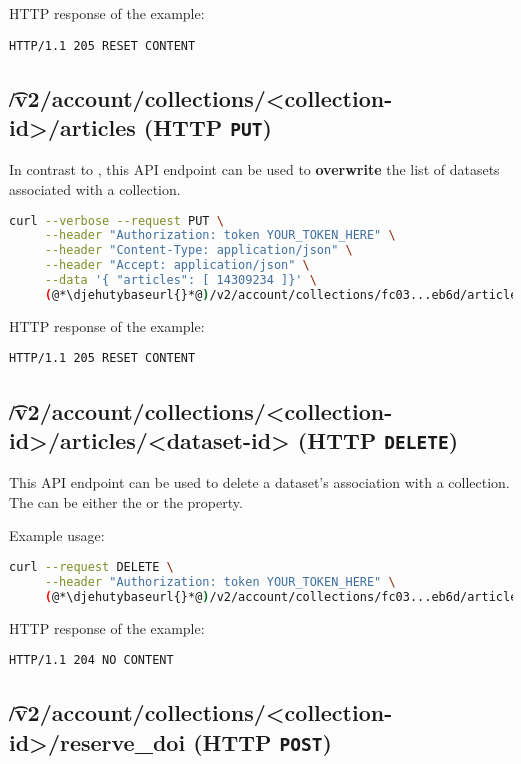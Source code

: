   HTTP response of the example:
\begin{lstlisting}
HTTP/1.1 205 RESET CONTENT
\end{lstlisting}

\subsection{\t{/v2/account/collections/<collection-id>/articles} (HTTP \texttt{PUT})}

  In contrast to , this API endpoint
  can be used to \textbf{overwrite} the list of datasets associated with a
  collection.

\begin{lstlisting}[language=bash]
curl --verbose --request PUT \
     --header "Authorization: token YOUR_TOKEN_HERE" \
     --header "Content-Type: application/json" \
     --header "Accept: application/json" \
     --data '{ "articles": [ 14309234 ]}' \
     (@*\djehutybaseurl{}*@)/v2/account/collections/fc03...eb6d/articles
\end{lstlisting}

  HTTP response of the example:
\begin{lstlisting}
HTTP/1.1 205 RESET CONTENT
\end{lstlisting}

\subsection{\t{/v2/account/collections/<collection-id>/articles/<dataset-id>} (HTTP \texttt{DELETE})}

  This API endpoint can be used to delete a dataset's association with a collection.
  The  can be either the  or the  property.

  Example usage:
\begin{lstlisting}[language=bash]
curl --request DELETE \
     --header "Authorization: token YOUR_TOKEN_HERE" \
     (@*\djehutybaseurl{}*@)/v2/account/collections/fc03...eb6d/articles/8050...10db
\end{lstlisting}

  HTTP response of the example:
\begin{lstlisting}
HTTP/1.1 204 NO CONTENT
\end{lstlisting}

\subsection{\t{/v2/account/collections/<collection-id>/reserve\_doi} (HTTP \texttt{POST})}

